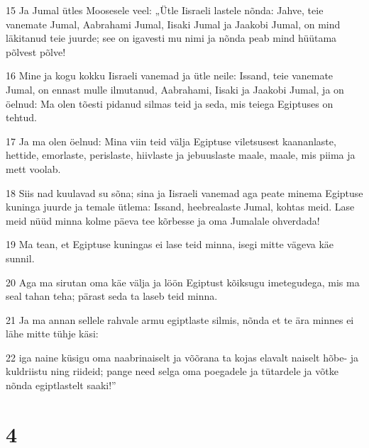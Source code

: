 \par 15 Ja Jumal ütles Moosesele veel: „Ütle Iisraeli lastele nõnda: Jahve, teie vanemate Jumal, Aabrahami Jumal, Iisaki Jumal ja Jaakobi Jumal, on mind läkitanud teie juurde; see on igavesti mu nimi ja nõnda peab mind hüütama põlvest põlve!
\par 16 Mine ja kogu kokku Iisraeli vanemad ja ütle neile: Issand, teie vanemate Jumal, on ennast mulle ilmutanud, Aabrahami, Iisaki ja Jaakobi Jumal, ja on öelnud: Ma olen tõesti pidanud silmas teid ja seda, mis teiega Egiptuses on tehtud.
\par 17 Ja ma olen öelnud: Mina viin teid välja Egiptuse viletsusest kaananlaste, hettide, emorlaste, perislaste, hiivlaste ja jebuuslaste maale, maale, mis piima ja mett voolab.
\par 18 Siis nad kuulavad su sõna; sina ja Iisraeli vanemad aga peate minema Egiptuse kuninga juurde ja temale ütlema: Issand, heebrealaste Jumal, kohtas meid. Lase meid nüüd minna kolme päeva tee kõrbesse ja oma Jumalale ohverdada!
\par 19 Ma tean, et Egiptuse kuningas ei lase teid minna, isegi mitte vägeva käe sunnil.
\par 20 Aga ma sirutan oma käe välja ja löön Egiptust kõiksugu imetegudega, mis ma seal tahan teha; pärast seda ta laseb teid minna.
\par 21 Ja ma annan sellele rahvale armu egiptlaste silmis, nõnda et te ära minnes ei lähe mitte tühje käsi:
\par 22 iga naine küsigu oma naabrinaiselt ja võõrana ta kojas elavalt naiselt hõbe- ja kuldriistu ning riideid; pange need selga oma poegadele ja tütardele ja võtke nõnda egiptlastelt saaki!”

\chapter{4}

